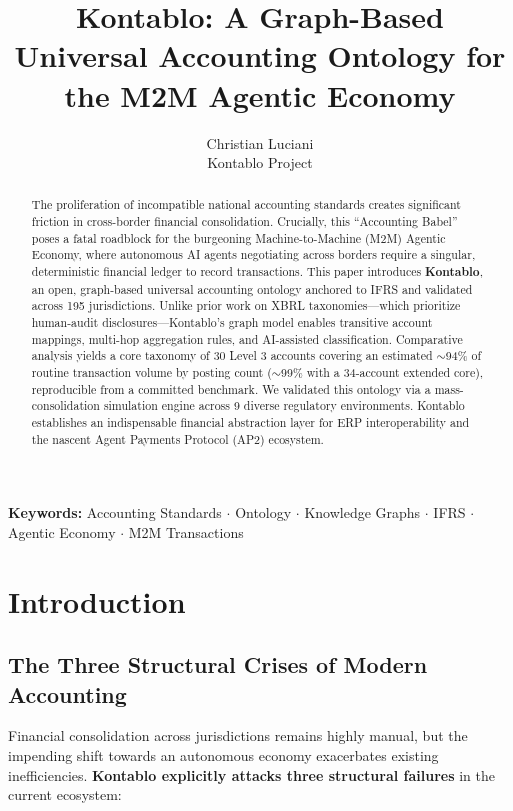\documentclass[12pt]{article}
\title{Kontablo: A Graph-Based Universal Accounting Ontology for the M2M Agentic Economy}
\author{Christian Luciani \\ Kontablo Project}
\date{}
\begin{document}
\maketitle

\begin{abstract}
The proliferation of incompatible national accounting standards creates significant friction in cross-border financial consolidation. Crucially, this ``Accounting Babel'' poses a fatal roadblock for the burgeoning Machine-to-Machine (M2M) Agentic Economy, where autonomous AI agents negotiating across borders require a singular, deterministic financial ledger to record transactions. This paper introduces \textbf{Kontablo}, an open, graph-based universal accounting ontology anchored to IFRS and validated across 195 jurisdictions. Unlike prior work on XBRL taxonomies—which prioritize human-audit disclosures—Kontablo's graph model enables transitive account mappings, multi-hop aggregation rules, and AI-assisted classification. Comparative analysis yields a core taxonomy of 30 Level 3 accounts covering an estimated $\sim$94\% of routine transaction volume by posting count ($\sim$99\% with a 34-account extended core), reproducible from a committed benchmark. We validated this ontology via a mass-consolidation simulation engine across 9 diverse regulatory environments. Kontablo establishes an indispensable financial abstraction layer for ERP interoperability and the nascent Agent Payments Protocol (AP2) ecosystem.
\end{abstract}

\vspace{1em}
\noindent \textbf{Keywords:} Accounting Standards $\cdot$ Ontology $\cdot$ Knowledge Graphs $\cdot$ IFRS $\cdot$ Agentic Economy $\cdot$ M2M Transactions

\section{Introduction}

\subsection{The Three Structural Crises of Modern Accounting}
Financial consolidation across jurisdictions remains highly manual, but the impending shift towards an autonomous economy exacerbates existing inefficiencies. \textbf{Kontablo explicitly attacks three structural failures} in the current ecosystem:
\end{document}
